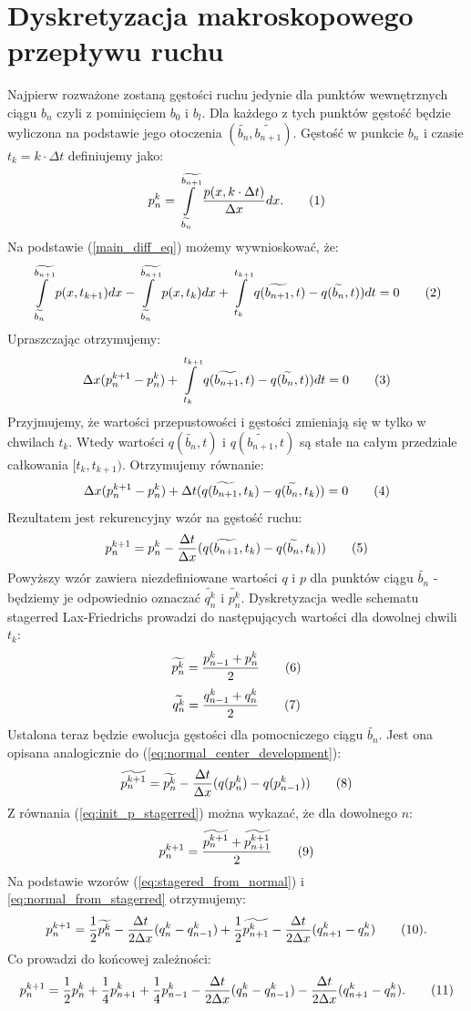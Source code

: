 \documentclass[12pt]{book}
\newcommand\addtag{\refstepcounter{equation}
\tag{\theequation}}
\begin{document}
\section{Dyskretyzacja makroskopowego przepływu ruchu}\label{sec:dyskretyzacja_ruchu}
Najpierw rozważone zostaną gęstości ruchu jedynie dla punktów wewnętrznych ciągu $b_n$ czyli z pominięciem $b_0$ i $b_l$.
Dla każdego z tych punktów gęstość będzie wyliczona na podstawie jego otoczenia $(\widetilde{b_{n}},\widetilde{b_{n+1}})$. Gęstość w punkcie $b_n$ i czasie $t_k=k\cdot \Delta t$ definiujemy jako:
\[p_{n}^{k}=\int\limits_{{\widetilde{b_{n}}}}^{{\widetilde{b_{n+1}}}} {\frac{p(x,k \cdot \Delta t)}{\Delta x}dx}. \addtag\]
 Na podstawie (\ref{main_diff_eq}) możemy wywnioskować, że:
\[\int\limits_{\widetilde{b_{n}}}^{\widetilde{b_{n+1}}} {p(x,t_{k+1})dx-\int\limits_{\widetilde{b_{n}}}^{\widetilde{b_{n+1}}}p(x,t_{k})dx} +\int\limits_{t_k}^{t_{k+1}} q(\widetilde{b_{n+1}},t)-q(\widetilde{b_{n}},t))dt=0 \addtag \label{eq:calki-LWR} \]
Upraszczając otrzymujemy:
\[\Delta x(p_n^{k+1}-p_n^{k}) +\int\limits_{t_k}^{t_{k+1}} q(\widetilde{b_{n+1}},t)-q(\widetilde{b_{n}},t))dt=0 \addtag \]
Przyjmujemy, że wartości przepustowości i gęstości zmieniają się w tylko w chwilach $t_k$. Wtedy wartości $q(\widetilde{b_n},t)$ i $q(\widetilde{b_{n+1}},t)$ są stałe na całym przedziale całkowania $[t_k,t_{k+1})$. Otrzymujemy równanie:
\[\Delta x(p_n^{k+1}-p_n^{k})  + \Delta t (q(\widetilde{b_{n+1}},t_k)-q(\widetilde{b_{n}},t_k))=0 \addtag \]
Rezultatem jest rekurencyjny wzór na gęstość ruchu:
\[p^{k+1}_n=p^{k}_n -\frac{\Delta t}{\Delta x} (q(\widetilde{b_{n+1}},t_k)-q(\widetilde{b_{n}},t_k)) \addtag \label{eq:normal_center_development} \]  
Powyższy wzór zawiera niezdefiniowane wartości $q$ i $p$ dla punktów ciągu $\widetilde{b_n}$ - będziemy je odpowiednio oznaczać $\widetilde{q_{n}^k}$ i $\widetilde{p_{n}^k}$. Dyskretyzacja wedle schematu stagerred Lax-Friedrichs \cite{gottlich} prowadzi do następujących wartości dla dowolnej chwili $t_k$:
\[ 
\widetilde{p_n^k} =  \frac{p_{n-1}^k+p_{n}^k}{2} \addtag \label{eq:init_p_stagerred}
\]
\[ 
\widetilde{q_n^k} =  \frac{q_{n-1}^k+q_{n}^k}{2} \addtag
\]
Ustalona teraz będzie ewolucja gęstości dla pomocniczego ciągu $\widetilde{b_n}$. Jest ona opisana analogicznie do (\ref{eq:normal_center_development}):
\[\widetilde{p^{k+1}_n}=\widetilde{p^k_n}- \frac{\Delta t}{\Delta x}(q(p^k_{n})-q(p^k_{n-1})) \addtag \label{eq:stagered_from_normal} \]
Z równania (\ref{eq:init_p_stagerred}) można wykazać, że dla dowolnego $n$:
\[p_n^{k+1}=\frac{\widetilde{p_{n}^{k+1}}+\widetilde{p_{n+1}^{k+1}}}{2} \addtag
\label{eq:normal_from_stagerred} \]
Na podstawie wzorów (\ref{eq:stagered_from_normal}) i \eqref{eq:normal_from_stagerred} otrzymujemy:
\[ p_n^{k+1} =\frac{1}{2}\widetilde{p^{k}_n}-\frac{\Delta t}{2\Delta x}(q^k_n-q^k_{n-1})+\frac{1}{2}\widetilde{p^{k}_{n+1}}-\frac{\Delta t}{2\Delta x}(q^k_{n+1}-q^k_{n})  \addtag .\]
Co prowadzi do końcowej zależności:
\[ p_n^{k+1} =\frac{1}{2}p_n^k+\frac{1}{4}p_{n+1}^k+\frac{1}{4}p_{n-1}^k  -\frac{\Delta t}{2\Delta x}(q^k_n-q^k_{n-1})-\frac{\Delta t}{2\Delta x}(q^k_{n+1}-q^k_{n}).  \addtag \]
\end{document}
